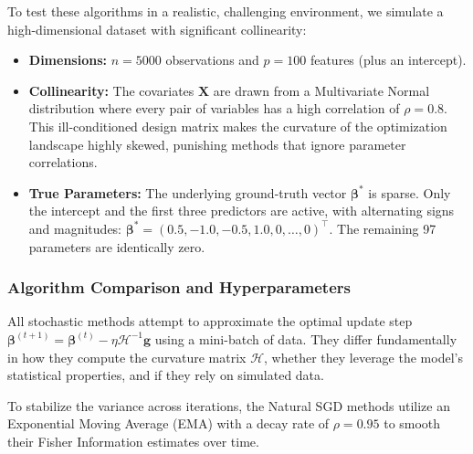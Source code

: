 \documentclass[
  letterpaper,
  DIV=11,
  numbers=noendperiod]{scrreprt}
\providecommand{\tightlist}{%
  \setlength{\itemsep}{0pt}\setlength{\parskip}{0pt}}
\renewcommand{\[}{\begin{equation}}
\renewcommand{\]}{\end{equation}}
\theoremstyle{definition}
\theoremstyle{plain}
\theoremstyle{plain}
\theoremstyle{plain}
\theoremstyle{definition}
\theoremstyle{plain}
\theoremstyle{remark}
\begin{document}
To test these algorithms in a realistic, challenging environment, we
simulate a high-dimensional dataset with significant collinearity:

\begin{itemize}
\tightlist
\item
  \textbf{Dimensions:} \(n = 5000\) observations and \(p = 100\)
  features (plus an intercept).
\item
  \textbf{Collinearity:} The covariates \(\mathbf{X}\) are drawn from a
  Multivariate Normal distribution where every pair of variables has a
  high correlation of \(\rho = 0.8\). This ill-conditioned design matrix
  makes the curvature of the optimization landscape highly skewed,
  punishing methods that ignore parameter correlations.
\item
  \textbf{True Parameters:} The underlying ground-truth vector
  \(\boldsymbol{\beta}^*\) is sparse. Only the intercept and the first
  three predictors are active, with alternating signs and magnitudes:
  \(\boldsymbol{\beta}^* = (0.5, -1.0, -0.5, 1.0, 0, \dots, 0)^\top\).
  The remaining 97 parameters are identically zero.
\end{itemize}

\subsubsection{Algorithm Comparison and
Hyperparameters}\label{algorithm-comparison-and-hyperparameters}

All stochastic methods attempt to approximate the optimal update step
\(\boldsymbol{\beta}^{(t+1)} = \boldsymbol{\beta}^{(t)} - \eta \mathcal{H}^{-1} \mathbf{g}\)
using a mini-batch of data. They differ fundamentally in how they
compute the curvature matrix \(\mathcal{H}\), whether they leverage the
model's statistical properties, and if they rely on simulated data.

To stabilize the variance across iterations, the Natural SGD methods
utilize an Exponential Moving Average (EMA) with a decay rate of
\(\rho = 0.95\) to smooth their Fisher Information estimates over time.
\end{document}
